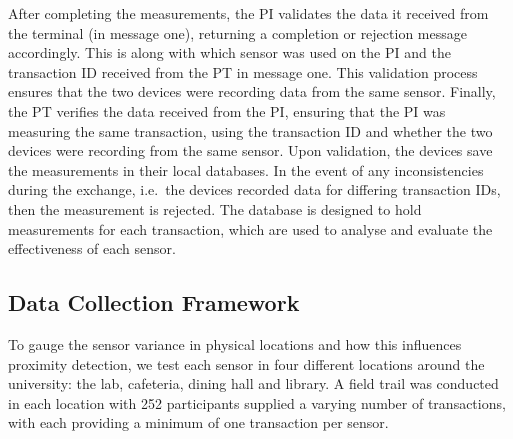 \documentclass{article}
\begin{document}
After completing the measurements, the PI validates the data it received from the terminal (in message one), returning a completion or rejection message accordingly.  This is along with which sensor was used on the PI and the transaction ID received from the PT in message one.  This validation process ensures that the two devices were recording data from the same sensor.
Finally, the PT verifies the data received from the PI, ensuring that the PI was measuring the same transaction, using the transaction ID and whether the two devices were recording from the same sensor. Upon validation, the devices save the measurements in their local databases.  In the event of any inconsistencies during the exchange, i.e.\ the devices recorded data for differing transaction IDs, then the measurement is rejected.  The database is designed to hold measurements for each transaction, which are used to analyse and evaluate the effectiveness of each sensor.

\subsection{Data Collection Framework}
\label{datacollectionsection}
To gauge the sensor variance in physical locations and how this influences proximity detection, we test each sensor in four different locations around the university: the lab, cafeteria, dining hall and library.  A field trail was conducted in each location with 252 participants supplied a varying number of transactions, with each providing a minimum of one transaction per sensor.
\end{document}
